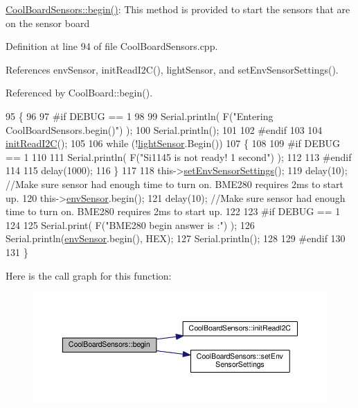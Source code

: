 \hyperlink{classCoolBoardSensors_a97095823ef7c8f5290812f1405b966b3}{Cool\+Board\+Sensors\+::begin()}\+: This method is provided to start the sensors that are on the sensor board 

Definition at line 94 of file Cool\+Board\+Sensors.\+cpp.



References env\+Sensor, init\+Read\+I2\+C(), light\+Sensor, and set\+Env\+Sensor\+Settings().



Referenced by Cool\+Board\+::begin().


\begin{DoxyCode}
95 \{  
96 
97 \textcolor{preprocessor}{#if DEBUG == 1 }
98      
99     Serial.println( F(\textcolor{stringliteral}{"Entering CoolBoardSensors.begin()"}) );
100     Serial.println();
101 
102 \textcolor{preprocessor}{#endif}
103 
104     \hyperlink{classCoolBoardSensors_acad6a8418c66d36868caca23c844ecb6}{initReadI2C}();
105 
106     \textcolor{keywordflow}{while} (!\hyperlink{classCoolBoardSensors_a3e397300fb707dd193e909a757bf6102}{lightSensor}.Begin()) 
107     \{
108     
109 \textcolor{preprocessor}{    #if DEBUG == 1}
110 
111         Serial.println( F(\textcolor{stringliteral}{"Si1145 is not ready!  1 second"}) );
112 
113 \textcolor{preprocessor}{    #endif}
114 
115         delay(1000);
116     \}
117      
118     this->\hyperlink{classCoolBoardSensors_a406307ffd70272282d91479c7ed8d66f}{setEnvSensorSettings}();
119     delay(10);  \textcolor{comment}{//Make sure sensor had enough time to turn on. BME280 requires 2ms to start up.}
120     this->\hyperlink{classCoolBoardSensors_a868e38985e9a2412829fa2790ca13e2e}{envSensor}.begin();
121     delay(10);  \textcolor{comment}{//Make sure sensor had enough time to turn on. BME280 requires 2ms to start up.}
122 
123 \textcolor{preprocessor}{#if DEBUG == 1 }
124     
125     Serial.print( F(\textcolor{stringliteral}{"BME280 begin answer is :"}) );
126     Serial.println(\hyperlink{classCoolBoardSensors_a868e38985e9a2412829fa2790ca13e2e}{envSensor}.begin(), HEX);
127     Serial.println();
128 
129 \textcolor{preprocessor}{#endif}
130 
131 \}
\end{DoxyCode}
Here is the call graph for this function\+:\nopagebreak
\begin{figure}[H]
\begin{center}
\leavevmode
\includegraphics[width=350pt]{classCoolBoardSensors_a97095823ef7c8f5290812f1405b966b3_cgraph}
\end{center}
\end{figure}
